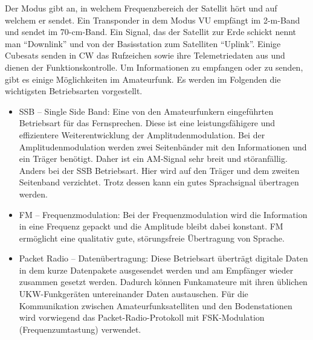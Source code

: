 Der Modus gibt an, in welchem Frequenzbereich der Satellit hört und auf welchem er sendet. Ein Transponder in dem 
Modus VU empfängt im 2-m-Band und sendet im 70-cm-Band. Ein Signal, das der Satellit zur Erde schickt nennt man ``Downlink'' und von der Basisstation 
zum Satelliten ``Uplink''.
Einige Cubesats senden in \ac{CW} das Rufzeichen sowie ihre Telemetriedaten aus und dienen der Funktionskontrolle.
\newpar
Um Informationen zu empfangen oder zu senden, gibt es einige Möglichkeiten im Amateurfunk. Es werden im Folgenden die wichtigsten 
Betriebsarten 
vorgestellt. 
\begin{itemize}
 \item SSB -- Single Side Band: Eine von den Amateurfunkern eingeführten Betriebsart für das Fernsprechen. Diese ist eine leistungsfähigere und 
effizientere Weiterentwicklung der Amplitudenmodulation. Bei der Amplitudenmodulation werden zwei Seitenbänder mit den Informationen und ein Träger 
benötigt. Daher ist ein AM-Signal sehr breit und störanfällig. Anders bei der SSB Betriebsart. Hier wird auf den Träger und dem zweiten Seitenband 
verzichtet. Trotz dessen kann ein gutes Sprachsignal übertragen werden. 
 \item FM -- Frequenzmodulation: Bei der Frequenzmodulation wird die Information in eine Frequenz gepackt und die Amplitude bleibt dabei 
konstant. FM ermöglicht eine qualitativ gute, störungsfreie Übertragung von Sprache.
 \item Packet Radio -- Datenübertragung: Diese Betriebsart überträgt digitale Daten in dem kurze Datenpakete ausgesendet werden und am Empfänger 
wieder zusammen gesetzt werden. Dadurch können Funkamateure mit ihren üblichen UKW-Funkgeräten untereinander Daten austauschen. Für die Kommunikation 
zwischen Amateurfunksatelliten und den Bodenstationen wird vorwiegend das Packet-Radio-Protokoll mit FSK-Modulation (Frequenzumtastung) verwendet.
\end{itemize}

